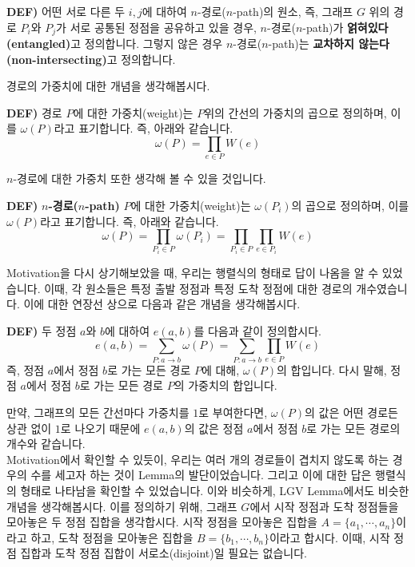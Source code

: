 \documentclass[a4paper]{article}
\begin{document}
\begin{mdframed}
\textbf{DEF)} 어떤 서로 다른 두 $i, j$에 대하여 $n$-경로($n$-path)의 원소, 즉, 그래프 $G$ 위의 경로 $P_i$와 $P_j$가 서로 공통된 정점을 공유하고 있을 경우, $n$-경로($n$-path)가 \textbf{얽혀있다(entangled)}고 정의합니다. 그렇지 않은 경우 $n$-경로($n$-path)는 \textbf{교차하지 않는다(non-intersecting)}고 정의합니다.
\end{mdframed}
경로의 가중치에 대한 개념을 생각해봅시다.\\[-0.4cm]
\begin{mdframed}
\textbf{DEF)} 경로 $P$에 대한 가중치(weight)는 $P$위의 간선의 가중치의 곱으로 정의하며, 이를 $\omega(P)$라고 표기합니다. 즉, 아래와 같습니다.$$\omega(P) = \prod_{e \in P}W(e)$$
\end{mdframed}
$n$-경로에 대한 가중치 또한 생각해 볼 수 있을 것입니다.\\[-0.4cm]
\begin{mdframed}
\textbf{DEF)} \textbf{$n$-경로($n$-path)} $P$에 대한 가중치(weight)는 $\omega(P_i)$의 곱으로 정의하며, 이를 $\omega(P)$라고 표기합니다. 즉, 아래와 같습니다.$$\omega(P) = \prod_{P_i \in P} \omega(P_i) = \prod_{P_i \in P}\prod_{e \in P_i}W(e)$$
\end{mdframed}
Motivation을 다시 상기해보았을 때, 우리는 행렬식의 형태로 답이 나옴을 알 수 있었습니다. 이때, 각 원소들은 특정 출발 정점과 특정 도착 정점에 대한 경로의 개수였습니다. 이에 대한 연장선 상으로 다음과 같은 개념을 생각해봅시다.\\[-0.4cm]
\begin{mdframed}
\textbf{DEF)} 두 정점 $a$와 $b$에 대하여 $e(a, b)$를 다음과 같이 정의합시다. $$e(a,b) = \sum_{P:a\rightarrow b}\omega(P) = \sum_{P:a\rightarrow b} \prod_{e \in P}W(e)$$ 즉, 정점 $a$에서 정점 $b$로 가는 모든 경로 $P$에 대해, $\omega(P)$의 합입니다. 다시 말해, 정점 $a$에서 정점 $b$로 가는 모든 경로 $P$의 가중치의 합입니다.
\end{mdframed}
만약, 그래프의 모든 간선마다 가중치를 $1$로 부여한다면, $\omega(P)$의 값은 어떤 경로든 상관 없이 $1$로 나오기 때문에 $e(a, b)$의 값은 정점 $a$에서 정점 $b$로 가는 모든 경로의 개수와 같습니다.\\
Motivation에서 확인할 수 있듯이, 우리는 여러 개의 경로들이 겹치지 않도록 하는 경우의 수를 세고자 하는 것이 Lemma의 발단이었습니다. 그리고 이에 대한 답은 행렬식의 형태로 나타남을 확인할 수 있었습니다. 이와 비슷하게, LGV Lemma에서도 비슷한 개념을 생각해봅시다. 이를 정의하기 위해, 그래프 $G$에서 시작 정점과 도착 정점들을 모아놓은 두 정점 집합을 생각합시다. 시작 정점을 모아놓은 집합을 $A = \{a_1, \cdots, a_n\}$이라고 하고, 도착 정점을 모아놓은 집합을 $B = \{b_1, \cdots, b_n\}$이라고 합시다. 이때, 시작 정점 집합과 도착 정점 집합이 서로소(disjoint)일 필요는 없습니다.\\[-0.4cm]
\end{document}
